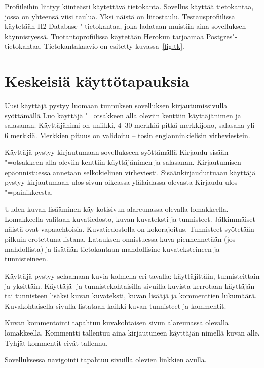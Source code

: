 \documentclass[finnish,colorlinks,headings=normal,parskip=half,footsepline]{scrartcl}
\begin{document}
Profiileihin liittyy kiinteästi käytettävä tietokanta. Sovellus käyttää tietokantaa, jossa on yhteensä viisi taulua. Yksi näistä on liitostaulu. Testausprofiilissa käytetään H2 Database "-tietokantaa, joka ladataan muistiin aina sovelluksen käynnistyessä. Tuotantoprofiilissa käytetään Herokun tarjoamaa Postgres"-tietokantaa. Tietokantakaavio on esitetty kuvassa~\ref{fig:tk}.

\section{Keskeisiä käyttötapauksia}
Uusi käyttäjä pystyy luomaan tunnuksen sovelluksen kirjautumissivulla syöttämällä Luo käyttäjä "=otsakkeen alla oleviin kenttiin käyttäjänimen ja salasanan. Käyttäjänimi on uniikki, 4--30 merkkiä pitkä merkkijono, salasana yli 6 merkkiä. Merkkien pituus on validoitu -- tosin englanninkielisin virheviestein.

Käyttäjä pystyy kirjautumaan sovellukseen syöttämällä Kirjaudu sisään "=otsakkeen alla oleviin kenttiin käyttäjänimen ja salasanan. Kirjautumisen epäonnistuessa annetaan selkokielinen virheviesti. Sisäänkirjauduttuaan käyttäjä pystyy kirjautumaan ulos sivun oikeassa ylälaidassa olevasta Kirjaudu ulos "=painikkeesta.

Uuden kuvan lisääminen käy kotisivun alareunassa olevalla lomakkeella. Lomakkeella valitaan kuvatiedosto, kuvan kuvateksti ja tunnisteet. Jälkimmäiset näistä ovat vapaaehtoisia. Kuvatiedostolla on kokorajoitus. Tunnisteet syötetään pilkuin erotettuna listana. Latauksen onnistuessa kuva piennennetään (jos mahdollista) ja lisätään tietokantaan mahdollisine kuvateksteineen ja tunnisteineen.

Käyttäjä pystyy selaamaan kuvia kolmella eri tavalla: käyttäjittäin, tunnisteittain ja yksittäin. Käyttäjä- ja tunnistekohtaisilla sivuilla kuvista kerrotaan käyttäjän tai tunnisteen lisäksi kuvan kuvateksti, kuvan lisääjä ja kommenttien lukumäärä. Kuvakohtaisella sivulla listataan kaikki kuvan tunnisteet ja kommentit.

Kuvan kommentointi tapahtuu kuvakohtaisen sivun alareunassa olevalla lomakkeella. Kommentti tallentuu aina kirjautuneen käyttäjän nimellä kuvan alle. Tyhjät kommentit eivät tallennu.

Sovelluksessa navigointi tapahtuu sivuilla olevien linkkien avulla.																																																																																																																																																																																																																																																																																																																																																																																																																				
\end{document}
